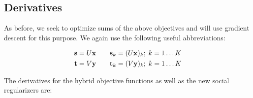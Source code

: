 \subsection{Derivatives}
As before, we seek to optimize sums of the above objectives and will use
gradient descent for this purpose. We again use the following useful abbreviations:

\begin{align*}
\mathbf{s} & = U \mathbf{x} \qquad \mathbf{s}_{k} = (U \mathbf{x})_{k}; \; k=1\ldots K\\
\mathbf{t} & = V \mathbf{y} \qquad \mathbf{t}_{k} = (V \mathbf{y})_{k}; \; k=1\ldots K
\end{align*}

The derivatives for the hybrid objective functions as well as the new social regularizers are:

\begin{itemize}

\end{itemize}
